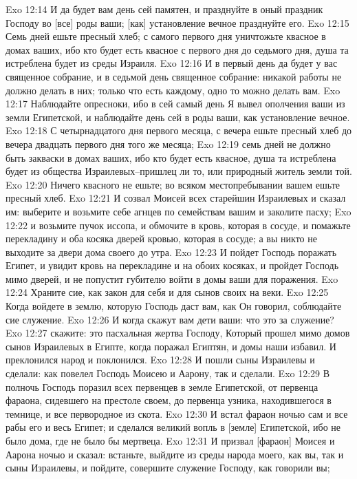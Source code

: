 Exo 12:14  И да будет вам день сей памятен, и празднуйте в оный праздник Господу во [все] роды ваши; [как] установление вечное празднуйте его.
Exo 12:15  Семь дней ешьте пресный хлеб; с самого первого дня уничтожьте квасное в домах ваших, ибо кто будет есть квасное с первого дня до седьмого дня, душа та истреблена будет из среды Израиля.
Exo 12:16  И в первый день да будет у вас священное собрание, и в седьмой день священное собрание: никакой работы не должно делать в них; только что есть каждому, одно то можно делать вам.
Exo 12:17  Наблюдайте опресноки, ибо в сей самый день Я вывел ополчения ваши из земли Египетской, и наблюдайте день сей в роды ваши, как установление вечное.
Exo 12:18  С четырнадцатого дня первого месяца, с вечера ешьте пресный хлеб до вечера двадцать первого дня того же месяца;
Exo 12:19  семь дней не должно быть закваски в домах ваших, ибо кто будет есть квасное, душа та истреблена будет из общества Израилевых--пришлец ли то, или природный житель земли той.
Exo 12:20  Ничего квасного не ешьте; во всяком местопребывании вашем ешьте пресный хлеб.
Exo 12:21  И созвал Моисей всех старейшин Израилевых и сказал им: выберите и возьмите себе агнцев по семействам вашим и заколите пасху;
Exo 12:22  и возьмите пучок иссопа, и обмочите в кровь, которая в сосуде, и помажьте перекладину и оба косяка дверей кровью, которая в сосуде; а вы никто не выходите за двери дома своего до утра.
Exo 12:23  И пойдет Господь поражать Египет, и увидит кровь на перекладине и на обоих косяках, и пройдет Господь мимо дверей, и не попустит губителю войти в домы ваши для поражения.
Exo 12:24  Храните сие, как закон для себя и для сынов своих на веки.
Exo 12:25  Когда войдете в землю, которую Господь даст вам, как Он говорил, соблюдайте сие служение.
Exo 12:26  И когда скажут вам дети ваши: что это за служение?
Exo 12:27  скажите: это пасхальная жертва Господу, Который прошел мимо домов сынов Израилевых в Египте, когда поражал Египтян, и домы наши избавил. И преклонился народ и поклонился.
Exo 12:28  И пошли сыны Израилевы и сделали: как повелел Господь Моисею и Аарону, так и сделали.
Exo 12:29  В полночь Господь поразил всех первенцев в земле Египетской, от первенца фараона, сидевшего на престоле своем, до первенца узника, находившегося в темнице, и все первородное из скота.
Exo 12:30  И встал фараон ночью сам и все рабы его и весь Египет; и сделался великий вопль в [земле] Египетской, ибо не было дома, где не было бы мертвеца.
Exo 12:31  И призвал [фараон] Моисея и Аарона ночью и сказал: встаньте, выйдите из среды народа моего, как вы, так и сыны Израилевы, и пойдите, совершите служение Господу, как говорили вы;
